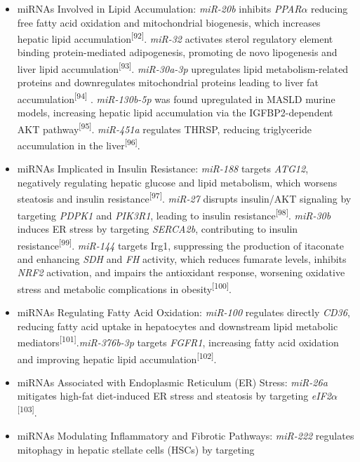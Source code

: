 \documentclass[
  11pt,
  letterpaper,
]{book}
\begin{document}
\begin{itemize}
\item
  miRNAs Involved in Lipid Accumulation: \emph{miR-20b} inhibits
  \emph{PPAR}\(\alpha\) reducing free fatty acid oxidation and
  mitochondrial biogenesis, which increases hepatic lipid
  accumulation\textsuperscript{{[}92{]}}. \emph{miR-32} activates sterol
  regulatory element binding protein-mediated adipogenesis, promoting de
  novo lipogenesis and liver lipid
  accumulation\textsuperscript{{[}93{]}}. \emph{miR-30a-3p} upregulates
  lipid metabolism-related proteins and downregulates mitochondrial
  proteins leading to liver fat accumulation\textsuperscript{{[}94{]}} .
  \emph{miR-130b-5p} was found upregulated in MASLD murine models,
  increasing hepatic lipid accumulation via the IGFBP2-dependent AKT
  pathway\textsuperscript{{[}95{]}}. \emph{miR-451a} regulates THRSP,
  reducing triglyceride accumulation in the
  liver\textsuperscript{{[}96{]}}.
\item
  miRNAs Implicated in Insulin Resistance: \emph{miR-188} targets
  \emph{ATG12}, negatively regulating hepatic glucose and lipid
  metabolism, which worsens steatosis and insulin
  resistance\textsuperscript{{[}97{]}}. \emph{miR-27} disrupts
  insulin/AKT signaling by targeting \emph{PDPK1} and \emph{PIK3R1},
  leading to insulin resistance\textsuperscript{{[}98{]}}.
  \emph{miR-30b} induces ER stress by targeting \emph{SERCA2b},
  contributing to insulin resistance\textsuperscript{{[}99{]}}.
  \emph{miR-144} targets Irg1, suppressing the production of itaconate
  and enhancing \emph{SDH} and \emph{FH} activity, which reduces
  fumarate levels, inhibits \emph{NRF2} activation, and impairs the
  antioxidant response, worsening oxidative stress and metabolic
  complications in obesity\textsuperscript{{[}100{]}}.
\item
  miRNAs Regulating Fatty Acid Oxidation: \emph{miR-100} regulates
  directly \emph{CD36}, reducing fatty acid uptake in hepatocytes and
  downstream lipid metabolic
  mediators\textsuperscript{{[}101{]}}.\emph{miR-376b-3p} targets
  \emph{FGFR1}, increasing fatty acid oxidation and improving hepatic
  lipid accumulation\textsuperscript{{[}102{]}}.
\item
  miRNAs Associated with Endoplasmic Reticulum (ER) Stress:
  \emph{miR-26a} mitigates high-fat diet-induced ER stress and steatosis
  by targeting \emph{eIF2}\(\alpha\)\textsuperscript{{[}103{]}}.
\item
  miRNAs Modulating Inflammatory and Fibrotic Pathways: \emph{miR-222}
  regulates mitophagy in hepatic stellate cells (HSCs) by targeting

\end{itemize}
\end{document}
